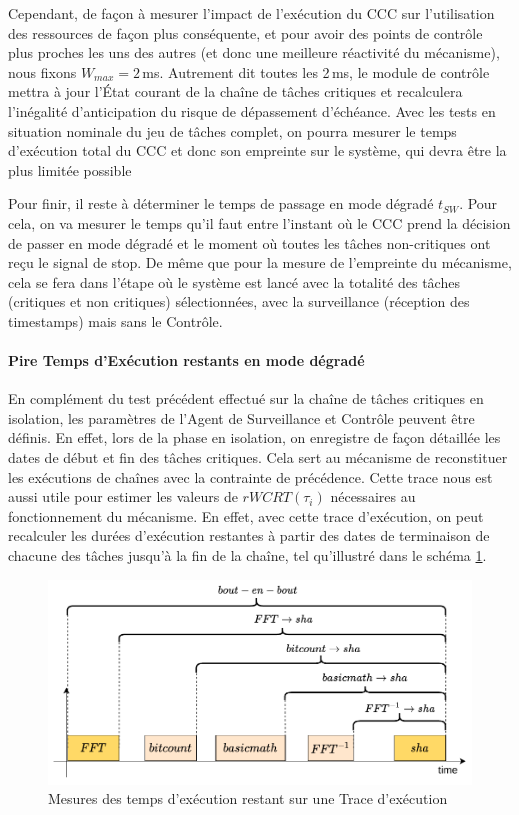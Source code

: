 \documentclass[french, a4paper, 11pt, twoside, pdftex]{StyleThese}
\begin{document}
Cependant, de façon à mesurer l'impact de l'exécution du CCC sur l'utilisation des ressources de façon plus conséquente, et pour avoir des points de contrôle plus proches les uns des autres (et donc une meilleure réactivité du mécanisme), nous fixons $W_{max} = 2$\,ms. Autrement dit toutes les 2\,ms, le module de contrôle mettra à jour l'État courant de la chaîne de tâches critiques et recalculera l'inégalité d'anticipation du risque de dépassement d'échéance. Avec les tests en situation nominale du jeu de tâches complet, on pourra mesurer le temps d'exécution total du CCC et donc son empreinte sur le système, qui devra être la plus limitée possible

Pour finir, il reste à déterminer le temps de passage en mode dégradé $t_{SW}$. Pour cela, on va mesurer le temps qu'il faut entre l'instant où le CCC prend la décision de passer en mode dégradé et le moment où toutes les tâches non-critiques ont reçu le signal de stop. De même que pour la mesure de l'empreinte du mécanisme, cela se fera dans l'étape  où le système est lancé avec la totalité des tâches (critiques et non critiques) sélectionnées, avec la surveillance (réception des timestamps) mais sans le Contrôle. 

\paragraph{Pire Temps d'Exécution restants en mode dégradé} En complément du test précédent effectué sur la chaîne de tâches critiques en isolation, les paramètres de l'Agent de Surveillance et Contrôle peuvent être définis. En effet, lors de la phase  en isolation, on enregistre de façon détaillée les dates de début et fin des tâches critiques. Cela sert au mécanisme de reconstituer les exécutions de chaînes avec la contrainte de précédence. Cette trace nous est aussi utile pour estimer les valeurs de $rWCRT(\tau_i)$ nécessaires au fonctionnement du mécanisme. 
En effet, avec cette trace d'exécution, on peut recalculer les durées d'exécution restantes à partir des dates de terminaison de chacune des tâches jusqu'à la fin de la chaîne, tel qu'illustré dans le schéma \ref{fig:chronogrammes-rwcrt-example}.

\begin{figure}[ht]
	\centering
	\includegraphics[width=0.8\linewidth]{schemas/mesures-rWCRT}
	\caption{Mesures des temps d'exécution restant sur une Trace d'exécution}
	\label{fig:chronogrammes-rwcrt-example}
\end{figure}
\end{document}
